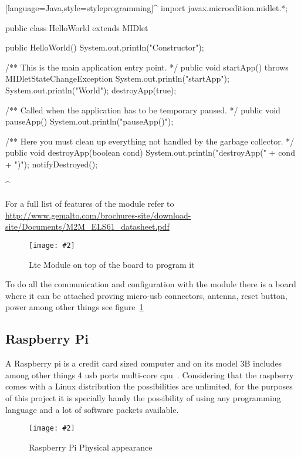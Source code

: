 \documentclass[hidelinks,11pt,a4paper,oneside,article]{memoir}
\newcommand{\putimage}[3][10] %
{
\begin{figure}[h]
	\centering
	\captionsetup{justification=centering}
	\texttt{[image: \#2]}
	\caption{#3}
	\label{fig:#2}
\end{figure}
}
\begin{document}
[language=Java,style=styleprogramming]^
import javax.microedition.midlet.*;

public class HelloWorld extends MIDlet {
    
    public HelloWorld() {
        System.out.println("Constructor");
    }
    
    /** This is the main application entry point. */
    public void startApp() throws MIDletStateChangeException {
        System.out.println("startApp");
        System.out.println("\nHello World\n");
        destroyApp(true);
    }
    
    /**  Called when the application has to be temporary paused. */
    public void pauseApp() {
        System.out.println("pauseApp()");
    }
    
    /** Here you must clean up everything not handled by the garbage collector. */
    public void destroyApp(boolean cond) {
        System.out.println("destroyApp(" + cond + ")");
        notifyDestroyed();
    }
}
^ %


For a full list of features of the module refer to \url{http://www.gemalto.com/brochures-site/download-site/Documents/M2M_ELS61_datasheet.pdf}


	\putimage{lte_board}{Lte Module on top of the board to program it}
To do all the communication and configuration with the module there is a board where it can be attached proving micro-usb connectors, antenna, reset button, power among other things see figure~\ref{fig:lte_board}





\subsection{Raspberry Pi}
A Raspberry pi is a credit card sized computer and on its model 3B includes among other things 4 \gls{usb} ports multi-core \gls{cpu}~\cite{rpi3}. Considering that the raspberry comes with a Linux distribution the possibilities are unlimited, for the purposes of this project it is specially handy the possibility of using any programming language and a lot of software packets available.

\putimage{raspberry}{Raspberry Pi Physical appearance}
\end{document}
